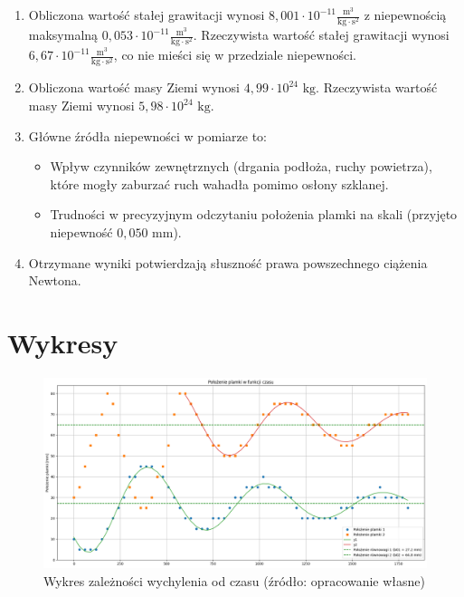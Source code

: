 \documentclass[a4paper,12pt]{article}
\begin{document}
\begin{enumerate}
    \item Obliczona wartość stałej grawitacji wynosi $8{,}001 \cdot 10^{-11} \frac{\text{m}^3}{\text{kg} \cdot \text{s}^2}$ z niepewnością maksymalną $0{,}053 \cdot 10^{-11} \frac{\text{m}^3}{\text{kg} \cdot \text{s}^2}$. Rzeczywista wartość stałej grawitacji wynosi $6{,}67 \cdot 10^{-11} \frac{\text{m}^3}{\text{kg} \cdot \text{s}^2}$, co nie mieści się w przedziale niepewności.

    \item Obliczona wartość masy Ziemi wynosi $4{,}99 \cdot 10^{24} \text{ kg}$. Rzeczywista wartość masy Ziemi wynosi $5{,}98 \cdot 10^{24} \text{ kg}$.

    \item Główne źródła niepewności w pomiarze to:
          \begin{itemize}
              \item Wpływ czynników zewnętrznych (drgania podłoża, ruchy powietrza), które mogły zaburzać ruch wahadła pomimo osłony szklanej.
              \item Trudności w precyzyjnym odczytaniu położenia plamki na skali (przyjęto niepewność $0{,}050$ mm).
          \end{itemize}

    \item Otrzymane wyniki potwierdzają słuszność prawa powszechnego ciążenia Newtona.
\end{enumerate}
\newpage

\section{Wykresy}

\begin{figure}[H]
    \centering
    \includegraphics[width=0.9\textheight,angle=90]{wykres.png}
    \caption{Wykres zależności wychylenia od czasu (źródło: opracowanie własne)}
    \label{fig:wykres}
\end{figure}




\end{document}
